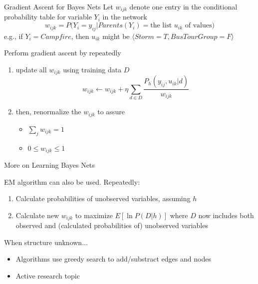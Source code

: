 \documentclass[%
pdf,
colorBG,
slideColor,
tcrico,
]{prosper}
\begin{document}
\begin{slide}{Gradient Ascent for Bayes Nets   }  
\tiny
Let $w_{ijk}$ denote one entry in the conditional probability table for
variable $Y_i$ in the network
\[ w_{ijk} = P(Y_i=y_{ij} | Parents(Y_i) = \mbox{the list $u_{ik}$ of values)} \]
e.g., if $Y_i = Campfire$, then $u_{ik}$ might be $\langle Storm=T, BusTourGroup=F \rangle$
 
Perform gradient ascent by repeatedly
\begin{enumerate}
\item update all $w_{ijk}$ using training data $D$
\[w_{ijk} \gets w_{ijk} + \eta \sum_{d \in D} \frac{P_h(y_{ij}, u_{ik} |
d)}{w_{ijk}} \]
\item then, renormalize the $w_{ijk}$ to assure
\begin{itemize}
\item $\sum_{j} w_{ijk} = 1$
\item $0 \leq w_{ijk} \leq 1$
\end{itemize}
\end{enumerate}
\end{slide}


\begin{slide}{More on Learning Bayes Nets   }  

EM algorithm can also be used. Repeatedly:
\begin{enumerate}
\item Calculate probabilities of unobserved variables, assuming $h$
\item Calculate new $w_{ijk}$ to maximize $E[\ln P(D|h)]$ where $D$ now includes
both observed and (calculated probabilities of) unobserved variables
\end{enumerate}

When structure unknown...
\begin{itemize}
\item Algorithms use greedy search to add/substract edges and nodes
\item Active research topic
\end{itemize}
\end{slide}

\end{document}
